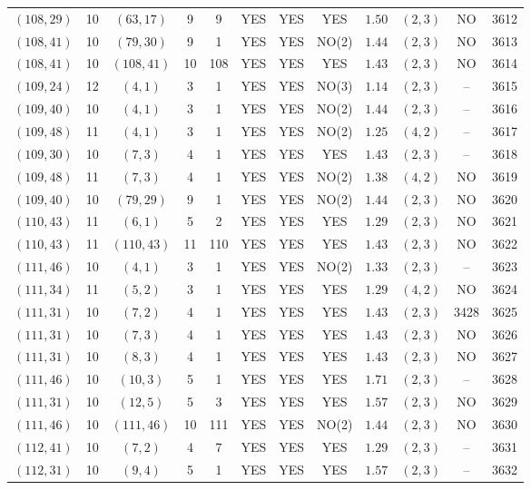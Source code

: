 \begin{longtable}{|c|c|c|c|c|c|c|c|c|c|c|c|}
$(108,29)$ & 10 & $(63,17)$ & 9 & 9 & YES & YES & YES & $1.50$ & $(2,3)$ & NO & 3612\\
$(108,41)$ & 10 & $(79,30)$ & 9 & 1 & YES & YES & NO(2) & $1.44$ & $(2,3)$ & NO & 3613\\
$(108,41)$ & 10 & $(108,41)$ & 10 & 108 & YES & YES & YES & $1.43$ & $(2,3)$ & NO & 3614\\
$(109,24)$ & 12 & $(4,1)$ & 3 & 1 & YES & YES & NO(3) & $1.14$ & $(2,3)$ & -- & 3615\\
$(109,40)$ & 10 & $(4,1)$ & 3 & 1 & YES & YES & NO(2) & $1.44$ & $(2,3)$ & -- & 3616\\
$(109,48)$ & 11 & $(4,1)$ & 3 & 1 & YES & YES & NO(2) & $1.25$ & $(4,2)$ & -- & 3617\\
$(109,30)$ & 10 & $(7,3)$ & 4 & 1 & YES & YES & YES & $1.43$ & $(2,3)$ & -- & 3618\\
$(109,48)$ & 11 & $(7,3)$ & 4 & 1 & YES & YES & NO(2) & $1.38$ & $(4,2)$ & NO & 3619\\
$(109,40)$ & 10 & $(79,29)$ & 9 & 1 & YES & YES & NO(2) & $1.44$ & $(2,3)$ & NO & 3620\\
$(110,43)$ & 11 & $(6,1)$ & 5 & 2 & YES & YES & YES & $1.29$ & $(2,3)$ & NO & 3621\\
$(110,43)$ & 11 & $(110,43)$ & 11 & 110 & YES & YES & YES & $1.43$ & $(2,3)$ & NO & 3622\\
$(111,46)$ & 10 & $(4,1)$ & 3 & 1 & YES & YES & NO(2) & $1.33$ & $(2,3)$ & -- & 3623\\
$(111,34)$ & 11 & $(5,2)$ & 3 & 1 & YES & YES & YES & $1.29$ & $(4,2)$ & NO & 3624\\
$(111,31)$ & 10 & $(7,2)$ & 4 & 1 & YES & YES & YES & $1.43$ & $(2,3)$ & 3428 & 3625\\
$(111,31)$ & 10 & $(7,3)$ & 4 & 1 & YES & YES & YES & $1.43$ & $(2,3)$ & NO & 3626\\
$(111,31)$ & 10 & $(8,3)$ & 4 & 1 & YES & YES & YES & $1.43$ & $(2,3)$ & NO & 3627\\
$(111,46)$ & 10 & $(10,3)$ & 5 & 1 & YES & YES & YES & $1.71$ & $(2,3)$ & -- & 3628\\
$(111,31)$ & 10 & $(12,5)$ & 5 & 3 & YES & YES & YES & $1.57$ & $(2,3)$ & NO & 3629\\
$(111,46)$ & 10 & $(111,46)$ & 10 & 111 & YES & YES & NO(2) & $1.44$ & $(2,3)$ & NO & 3630\\
$(112,41)$ & 10 & $(7,2)$ & 4 & 7 & YES & YES & YES & $1.29$ & $(2,3)$ & -- & 3631\\
$(112,31)$ & 10 & $(9,4)$ & 5 & 1 & YES & YES & YES & $1.57$ & $(2,3)$ & -- & 3632\\

\end{longtable}
